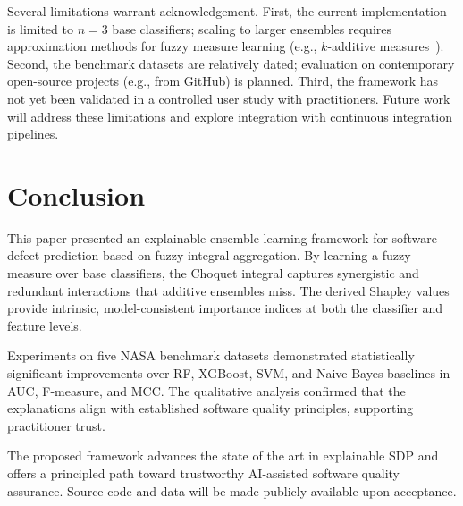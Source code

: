 \documentclass[10pt,twocolumn]{article}
\begin{document}
Several limitations warrant acknowledgement. First, the current implementation is limited
to $n=3$ base classifiers; scaling to larger ensembles requires approximation methods for
fuzzy measure learning (e.g., $k$-additive measures~\cite{grabisch1997k}). Second, the
benchmark datasets are relatively dated; evaluation on contemporary open-source projects
(e.g., from GitHub) is planned. Third, the framework has not yet been validated in a
controlled user study with practitioners. Future work will address these limitations and
explore integration with continuous integration pipelines.

\section{Conclusion}
\label{sec:conclusion}

This paper presented an explainable ensemble learning framework for software defect
prediction based on fuzzy-integral aggregation. By learning a fuzzy measure over base
classifiers, the Choquet integral captures synergistic and redundant interactions that
additive ensembles miss. The derived Shapley values provide intrinsic, model-consistent
importance indices at both the classifier and feature levels.

Experiments on five NASA benchmark datasets demonstrated statistically significant
improvements over RF, XGBoost, SVM, and Naive Bayes baselines in AUC, F-measure, and MCC.
The qualitative analysis confirmed that the explanations align with established software
quality principles, supporting practitioner trust.

The proposed framework advances the state of the art in explainable SDP and offers a
principled path toward trustworthy AI-assisted software quality assurance. Source code and
data will be made publicly available upon acceptance.
\end{document}
